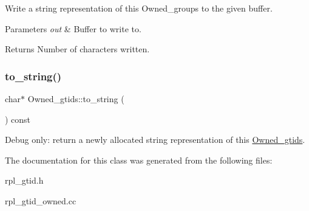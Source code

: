 Write a string representation of this Owned\+\_\+groups to the given buffer.


\begin{DoxyParams}{Parameters}
{\em out} & Buffer to write to. \\
\hline
\end{DoxyParams}
\begin{DoxyReturn}{Returns}
Number of characters written. 
\end{DoxyReturn}
\mbox{\label{classOwned__gtids_ad4abec5df6285656ea7f69a4bef7ba79}} 
\subsubsection{\texorpdfstring{to\+\_\+string()}{to\_string()}\hspace{0.1cm}{\footnotesize\ttfamily [2/2]}}
{\footnotesize\ttfamily char$\ast$ Owned\+\_\+gtids\+::to\+\_\+string (\begin{DoxyParamCaption}{ }\end{DoxyParamCaption}) const\hspace{0.3cm}{\ttfamily [inline]}}

Debug only\+: return a newly allocated string representation of this \mbox{\hyperlink{classOwned__gtids}{Owned\+\_\+gtids}}. 

The documentation for this class was generated from the following files\+:\begin{DoxyCompactItemize}
\item 
rpl\+\_\+gtid.\+h\item 
rpl\+\_\+gtid\+\_\+owned.\+cc\end{DoxyCompactItemize}
